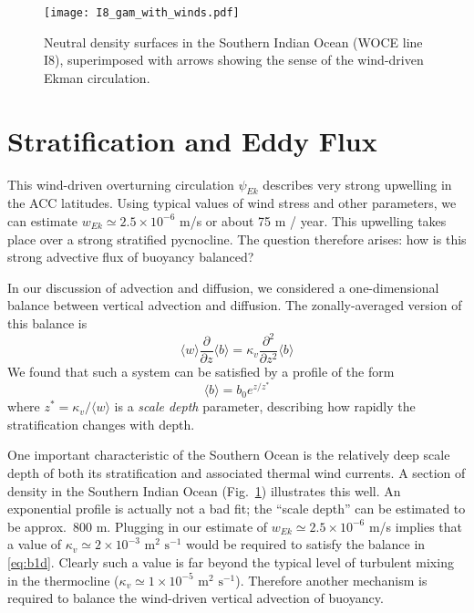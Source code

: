 \documentclass[12pt]{article}
\newcommand{\pd}[2]{ \frac{\partial #1}{\partial #2} }
\newcommand{\ab}[1]{\ensuremath{\langle #1 \rangle}}
\newcommand{\mms}{\ensuremath{\mbox{ m}^2 \mbox{ s}^{-1}}}
\begin{document}
\begin{figure}[htbp]
\begin{center}
\texttt{[image: I8\_gam\_with\_winds.pdf]}
\caption{Neutral density surfaces in the Southern Indian Ocean (WOCE line I8), superimposed with arrows showing the sense of the wind-driven Ekman circulation.}
\label{fig:gamma}
\end{center}
\end{figure}


\section{Stratification and Eddy Flux}
This wind-driven overturning circulation $\psi_{Ek}$ describes very strong upwelling in the ACC latitudes. Using typical values of wind stress and other parameters, we can estimate $w_{Ek} \simeq 2.5 \times 10^{-6}$ m/s or about 75 m / year. This upwelling takes place over a strong stratified pycnocline. The question therefore arises: how is this strong advective flux of buoyancy balanced?

In our discussion of advection and diffusion, we considered a one-dimensional balance between vertical advection and diffusion. The zonally-averaged version of this balance is
\begin{equation}
\ab{w} \pd{}{z} \ab{b} = \kappa_v \pd{^2}{z^2} \ab{b}
\label{eq:b1d}
\end{equation}
We found that such a system can be satisfied by a profile of the form
\begin{equation}
\ab{b} = b_0 e^{z/z^\ast} 
\end{equation}
where $z^\ast = \kappa_v / \ab{w}$ is a {\em scale depth} parameter, describing how rapidly the stratification changes with depth.

One important characteristic of the Southern Ocean is the relatively deep scale depth of both its stratification and associated thermal wind currents. A section of density in the Southern Indian Ocean (Fig.~\ref{fig:gamma}) illustrates this well. An exponential profile is actually not a bad fit; the ``scale depth'' can be estimated to be approx.~800 m. Plugging in our estimate of $w_{Ek} \simeq 2.5 \times 10^{-6}$ m/s implies that a value of $\kappa_v \simeq 2 \times 10^{-3} \mms$ would be required to satisfy the balance in \eqref{eq:b1d}. Clearly such a value is far beyond the typical level of turbulent mixing in the thermocline ($\kappa_v \simeq 1 \times 10^{-5} \mms$). Therefore another mechanism is required to balance the wind-driven vertical advection of buoyancy.
\end{document}
